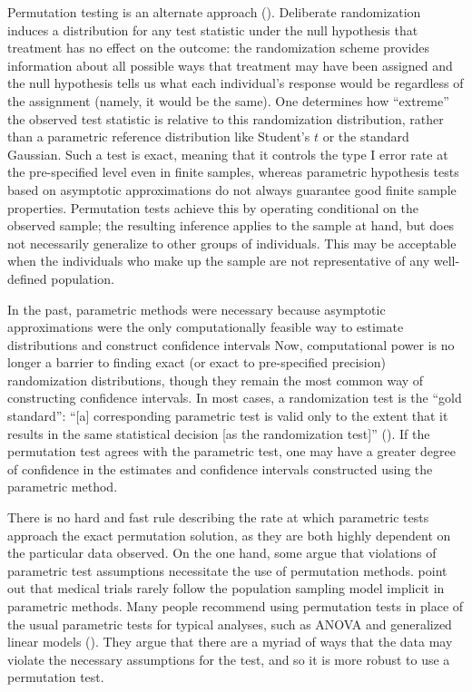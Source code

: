 \documentclass[12pt]{article}
\begin{document}
Permutation testing is an alternate approach (\cite{fisher_design_1935, pitman_significance_1937,pitman_significance_1938}).
Deliberate randomization induces a distribution for any test statistic under the null hypothesis that treatment has no effect on the outcome:
the randomization scheme provides information about all possible ways that treatment may have been assigned 
and the null hypothesis tells us what each individual's response would be regardless of the assignment (namely, it would be the same).
One determines how ``extreme'' the observed test statistic is relative to this randomization distribution, rather than a parametric reference distribution like Student's $t$ or the standard Gaussian.
Such a test is exact, meaning that it controls the type I error rate at the pre-specified level even in finite samples, whereas parametric hypothesis tests based on asymptotic approximations do not always guarantee good finite sample properties.
Permutation tests achieve this by operating conditional on the observed sample; the resulting inference applies to the sample at hand, but does not necessarily generalize to other groups of individuals.
This may be acceptable when the individuals who make up the sample are not representative of any well-defined population.

In the past, parametric methods were necessary because asymptotic approximations were the only computationally feasible way to estimate distributions and construct confidence intervals
Now, computational power is no longer a barrier to finding exact (or exact to pre-specified precision) randomization distributions, though they remain the most common way of constructing confidence intervals.
In most cases, a randomization test is the ``gold standard'':
``[a] corresponding parametric test is valid only to the extent that it results in the same statistical decision [as the randomization test]'' (\cite{bradley_distribution_1968}).
If the permutation test agrees with the parametric test, one may have a greater degree of confidence in the estimates and confidence intervals constructed using the parametric method.

There is no hard and fast rule describing the rate at which parametric tests approach the exact permutation solution, as they are both highly dependent on the particular data observed.
On the one hand, some argue that violations of parametric test assumptions necessitate the use of permutation methods.
\cite{ludbrook_why_1998} point out that medical trials rarely follow the population sampling model implicit in parametric methods.
Many people recommend using permutation tests in place of the usual parametric tests for typical analyses, such as ANOVA and generalized linear models (\cite{still_approximate_1981, winkler_permutation_2014}).
They argue that there are a myriad of ways that the data may violate the necessary assumptions for the test, and so it is more robust to use a permutation test.
\end{document}
